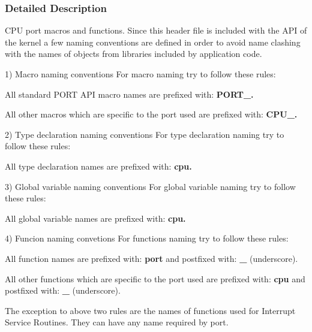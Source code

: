 \subsubsection{Detailed Description}
C\-P\-U port macros and functions. Since this header file is included with the A\-P\-I of the kernel a few naming conventions are defined in order to avoid name clashing with the names of objects from libraries included by application code.

\begin{DoxyParagraph}{1) Macro naming conventions}
For macro naming try to follow these rules\-:
\begin{DoxyItemize}
\item All standard P\-O\-R\-T A\-P\-I macro names are prefixed with\-: {\bfseries {\ttfamily P\-O\-R\-T\-\_\-}.} 
\item All other macros which are specific to the port used are prefixed with\-: {\bfseries {\ttfamily C\-P\-U\-\_\-}.} 
\end{DoxyItemize}
\end{DoxyParagraph}
\begin{DoxyParagraph}{2) Type declaration naming conventions}
For type declaration naming try to follow these rules\-:
\begin{DoxyItemize}
\item All type declaration names are prefixed with\-: {\bfseries {\ttfamily cpu}.} 
\end{DoxyItemize}
\end{DoxyParagraph}
\begin{DoxyParagraph}{3) Global variable naming conventions}
For global variable naming try to follow these rules\-:
\begin{DoxyItemize}
\item All global variable names are prefixed with\-: {\bfseries {\ttfamily cpu}.} 
\end{DoxyItemize}
\end{DoxyParagraph}
\begin{DoxyParagraph}{4) Funcion naming convetions}
For functions naming try to follow these rules\-:
\begin{DoxyItemize}
\item All function names are prefixed with\-: {\bfseries {\ttfamily port}} and postfixed with\-: {\bfseries {\ttfamily \-\_\-} }(underscore).
\item All other functions which are specific to the port used are prefixed with\-: {\bfseries {\ttfamily cpu}} and postfixed with\-: {\bfseries {\ttfamily \-\_\-} }(underscore).
\item The {\ttfamily exception} to above two rules are the names of functions used for Interrupt Service Routines. They can have any name required by port. 
\end{DoxyItemize}
\end{DoxyParagraph}


